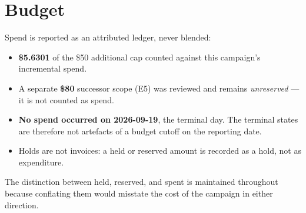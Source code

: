 \section{Budget}

Spend is reported as an attributed ledger, never blended:

\begin{itemize}[leftmargin=1.4em,itemsep=2pt]
  \item \textbf{\$5.6301} of the \$50 additional cap counted against this
  campaign's incremental spend.
  \item A separate \textbf{\$80} successor scope (E5) was reviewed and remains
  \emph{unreserved} --- it is not counted as spend.
  \item \textbf{No spend occurred on 2026-09-19}, the terminal day. The terminal
  states are therefore not artefacts of a budget cutoff on the reporting date.
  \item Holds are not invoices: a held or reserved amount is recorded as a hold,
  not as expenditure.
\end{itemize}

The distinction between held, reserved, and spent is maintained throughout because
conflating them would misstate the cost of the campaign in either direction.
